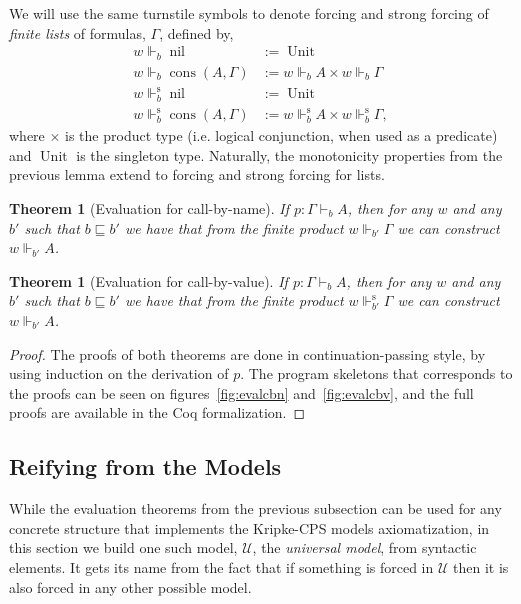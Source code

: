 \documentclass{eptcs}
\DeclareMathOperator{\Nil}{nil}
\DeclareMathOperator{\Cons}{cons}
\DeclareMathOperator{\Unit}{Unit}
\newcommand{\forces}[3]{{#1}\Vdash_{#2}{#3}}
\newcommand{\sforces}[3]{{#1}\Vdash^{\text{s}}_{#2}{#3}}
\newcommand{\nil}{{\Nil}}
\newcommand{\cons}[2]{{\Cons{(#1,#2)}}}
\newcommand{\Universal}{\mathcal{U}}
\theoremstyle{definition}
\theoremstyle{plain}
\newtheorem{theorem}[definition]{Theorem}
\theoremstyle{remark}
\begin{document}
We will use the same turnstile symbols to denote forcing and strong forcing of \emph{finite lists} of formulas, $\Gamma$, defined by,
\begin{align*}
  \forces{w}{b}{\nil} &:= \Unit\\
  \forces{w}{b}{\cons{A}{\Gamma}} &:= \forces{w}{b}{A}\times \forces{w}{b}{\Gamma} \\
  \sforces{w}{b}{\nil} &:= \Unit\\
  \sforces{w}{b}{\cons{A}{\Gamma}} &:= \sforces{w}{b}{A}\times \sforces{w}{b}{\Gamma},
\end{align*}
where $\times$ is the product type (i.e. logical conjunction, when used as a predicate) and $\Unit$ is the singleton type. Naturally, the monotonicity properties from the previous lemma extend to forcing and strong forcing for lists.

\begin{theorem}[Evaluation for call-by-name]\label{thm:eval:cbn} If $p: \Gamma\vdash_b A$, then for any $w$ and any $b'$ such that $b\sqsubseteq b'$ we have that from the finite product $\forces{w}{b'}{\Gamma}$ we can construct $\forces{w}{b'}{A}$.
\end{theorem}
\begin{theorem}[Evaluation for call-by-value]\label{thm:eval:cbv} If $p: \Gamma\vdash_b A$, then for any $w$ and any $b'$ such that $b\sqsubseteq b'$ we have that from the finite product $\sforces{w}{b'}{\Gamma}$ we can construct $\forces{w}{b'}{A}$.
\end{theorem}
\begin{proof}The proofs of both theorems are done in continuation-passing style, by using induction on the derivation of $p$. The program skeletons that corresponds to the proofs can be seen on figures~\ref{fig:evalcbn} and~\ref{fig:evalcbv}, 
 and the full proofs are available in the Coq formalization.\end{proof}

\subsection{Reifying from the Models}\label{subsec:completeness}

While the evaluation theorems from the previous subsection can be used for any concrete structure that implements the Kripke-CPS models axiomatization, in this section we build one such model, $\Universal$, the \emph{universal model}, from syntactic elements. It gets its name from the fact that if something is forced in $\Universal$ then it is also forced in any other possible model.
\end{document}
